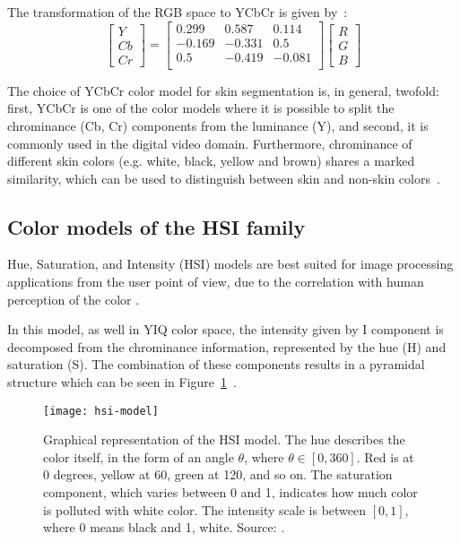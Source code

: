 The transformation of the RGB space to YCbCr is given by~\citep{pedrini:08}:\\
\begin{equation}
  \begin{bmatrix}
    Y \\ Cb \\ Cr
  \end{bmatrix} = 
  \begin{bmatrix}
     0.299 &  0.587 &  0.114 \\
    -0.169 & -0.331 &  0.5   \\
     0.5   & -0.419 & -0.081 \\
  \end{bmatrix}
  \begin{bmatrix}
    R \\ G \\ B
  \end{bmatrix}
\end{equation}

The choice of YCbCr color model for skin segmentation is, in general, twofold: first, YCbCr is one of the color models where it is possible to split the chrominance (Cb, Cr) components from the luminance (Y), and second, it is commonly used in the digital video domain. Furthermore, chrominance of different skin colors (e.g. white, black, yellow and brown) shares a marked similarity, which can be used to distinguish between skin and non-skin colors~\citep{phung:02}.

\subsection{Color models of the HSI family}
\label{sec:modelo_cores_hsi}

Hue, Saturation, and Intensity (HSI) models are best suited for image processing applications from the user point of view, due to the correlation with human perception of the color \citep{konstantinos:00}.

In this model, as well in YIQ color space, the intensity given by I component is decomposed from the chrominance information, represented by the hue (H) and saturation (S). The combination of these components results in a pyramidal structure which can be seen in Figure~\ref{fig:hsi-model}~\citep{konstantinos:00}.

\begin{figure}[!hbt]
  \centering
  \texttt{[image: hsi-model]}
  \caption[Graphical representation of the HSI model]{Graphical representation of the HSI model. The hue describes the color itself, in the form of an angle $\theta$, where $\theta \in [0, 360]$. Red is at 0 degrees, yellow at 60, green at 120, and so on. The saturation component, which varies between 0 and 1, indicates how much color is polluted with white color. The intensity scale is between $[0, 1]$, where 0 means black and 1, white. Source: \citet{blackice:16}.}
  \label{fig:hsi-model} 
\end{figure}

